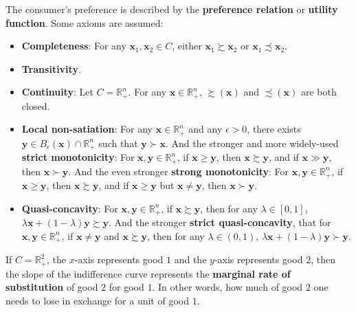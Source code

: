 \documentclass[openany]{book}
\theoremstyle{remark}
\begin{document}
The consumer's preference is described by the \textbf{preference relation} or \textbf{utility function}. Some axioms are assumed:
\begin{itemize}
    \item \textbf{Completeness}: For any $\boldsymbol{x}_1,\boldsymbol{x}_2\in C$, either $\boldsymbol{x}_1\succsim \boldsymbol{x}_2$ or $\boldsymbol{x}_1\precsim \boldsymbol{x}_2$.

    \item \textbf{Transitivity}.

    \item \textbf{Continuity}: Let $C=\mathbb{R}_+^n$. For any $\boldsymbol{x}\in \mathbb{R}_+^n$, $\succsim\!(\boldsymbol{x})$ and $\precsim\!(\boldsymbol{x})$ are both closed.

    \item \textbf{Local non-satiation}: For any $\boldsymbol{x}\in \mathbb{R}_+^n$ and any $\epsilon>0$, there exists $\boldsymbol{y}\in B_{\epsilon}(\boldsymbol{x})\cap \mathbb{R}_+^n$ such that $\boldsymbol{y}\succ \boldsymbol{x}$. And the stronger and more widely-used \textbf{strict monotonicity}: For $\boldsymbol{x},\boldsymbol{y}\in \mathbb{R}_+^n$, if $\boldsymbol{x}\ge \boldsymbol{y}$, then $\boldsymbol{x}\succsim \boldsymbol{y}$, and if $\boldsymbol{x}\gg \boldsymbol{y}$, then $\boldsymbol{x}\succ \boldsymbol{y}$. And the even stronger \textbf{strong monotonicity}: For $\boldsymbol{x},\boldsymbol{y}\in \mathbb{R}_+^n$, if $\boldsymbol{x}\ge \boldsymbol{y}$, then $\boldsymbol{x}\succsim \boldsymbol{y}$, and if $\boldsymbol{x}\ge \boldsymbol{y}$ but $\boldsymbol{x}\ne \boldsymbol{y}$, then $\boldsymbol{x}\succ \boldsymbol{y}$.

    \item \textbf{Quasi-concavity}: For $\boldsymbol{x},\boldsymbol{y}\in \mathbb{R}_+^n$, if $\boldsymbol{x}\succsim \boldsymbol{y}$, then for any $\lambda\in[0,1]$, $\lambda \boldsymbol{x}+(1-\lambda)\boldsymbol{y}\succsim \boldsymbol{y}$. And the stronger \textbf{strict quasi-concavity}, that for $\boldsymbol{x},\boldsymbol{y}\in \mathbb{R}_+^n$, if $\boldsymbol{x}\ne \boldsymbol{y}$ and $\boldsymbol{x}\succsim \boldsymbol{y}$, then for any $\lambda\in(0,1)$, $\lambda \boldsymbol{x}+(1-\lambda)\boldsymbol{y}\succ \boldsymbol{y}$.
\end{itemize}
If $C=\mathbb{R}_+^2$, the $x$-axis represents good $1$ and the $y$-axis represents good $2$, then the slope of the indifference curve represents the \textbf{marginal rate of substitution} of good $2$ for good $1$. In other words, how much of good $2$ one needs to lose in exchange for a unit of good $1$.
\end{document}
